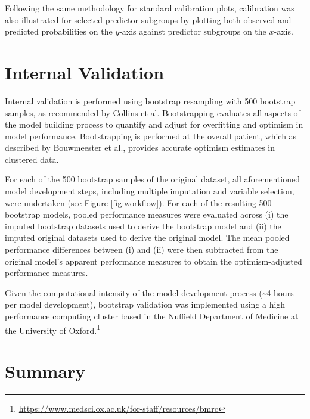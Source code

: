Following the same methodology for standard calibration plots, calibration was also illustrated for selected predictor subgroups by plotting both observed and predicted probabilities on the $y$-axis against predictor subgroups on the $x$-axis.

\section{Internal Validation}

Internal validation is performed using bootstrap resampling with 500 bootstrap samples, as recommended by Collins et al\cite{collins2024B}. Bootstrapping evaluates all aspects of the model building process to quantify and adjust for overfitting and optimism in model performance\cite{collins2024B}. Bootstrapping is performed at the overall patient, which as described by Bouwmeester et al., provides accurate optimism estimates in clustered data\cite{bouwmeester2013B}.

For each of the 500 bootstrap samples of the original dataset, all aforementioned model development steps, including multiple imputation and variable selection, were undertaken (see Figure \ref{fig:workflow}). For each of the resulting 500 bootstrap models, pooled performance measures were evaluated across (i) the imputed bootstrap datasets used to derive the bootstrap model and (ii) the imputed original datasets used to derive the original model. The mean pooled performance differences between (i) and (ii) were then subtracted from the original model's apparent performance measures to obtain the optimism-adjusted performance measures. 

Given the computational intensity of the model development process (\textasciitilde 4 hours per model development), bootstrap validation was implemented using a high performance computing cluster based in the Nuffield Department of Medicine at the University of Oxford.\footnote{\url{https://www.medsci.ox.ac.uk/for-staff/resources/bmrc}}

\section{Summary}

